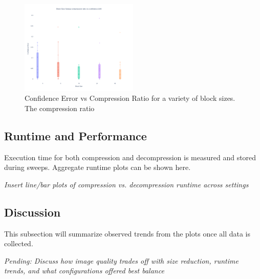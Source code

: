 \begin{figure}
    \label{fig:block_size_sweep}
    \includegraphics[width=0.5\textwidth]{assets/Confidence Err Vs Block Size.png}
    \caption{Confidence Error vs Compression Ratio for a variety of block sizes. The compression ratio }
\end{figure}
\subsection{Runtime and Performance}
Execution time for both compression and decompression is measured and stored during sweeps. Aggregate runtime plots can be shown here.

\textit{Insert line/bar plots of compression vs. decompression runtime across settings}

\subsection{Discussion}
This subsection will summarize observed trends from the plots once all data is collected.

\textit{Pending: Discuss how image quality trades off with size reduction, runtime trends, and what configurations offered best balance}
